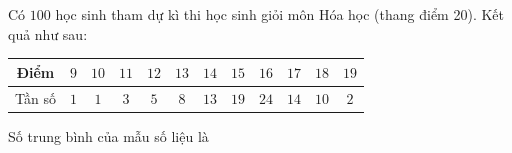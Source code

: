 \begin{ex}
Có $100$ học sinh tham dự kì thi học sinh giỏi môn Hóa học (thang điểm 20). Kết quả như sau:
\begin{center}
\begin{tabular}{|c|c|c|c|c|c|c|c|c|c|c|c|}\hline
Điểm & $9$ & $10$ & $11$ & $12$ & $13$ & $14$ & $15$ & $16$ & $17$ & $18$ & $19$\\\hline
Tần số & $1$ & $1$ & $3$ & $5$ & $8$ & $13$ & $19$ & $24$ & $14$ & $10$ & $2$\\\hline
\end{tabular}
\end{center}
Số trung bình của mẫu số liệu là
\end{ex}

